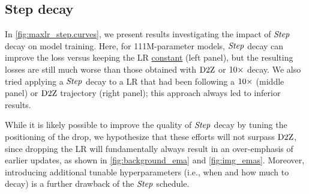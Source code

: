 \subsection{Step decay}




In \cref{fig:maxlr_step.curves}, we present results investigating the
impact of $\mbox{\emph{Step}}$ decay on model training.  Here, for 111M-parameter
models, $\mbox{\emph{Step}}$ decay can improve the loss versus keeping the LR
\underline{constant} (left panel), but the resulting losses are still
much worse than those obtained with $\mbox{D2Z}$ or $\mbox{10}\times$ decay.  We also
tried applying a $\mbox{\emph{Step}}$ decay to a LR that had been following a
$\mbox{10}\times$ (middle panel) or $\mbox{D2Z}$ trajectory (right panel); this
approach always led to inferior results.

While it is likely possible to improve the quality of $\mbox{\emph{Step}}$ decay by
tuning the positioning of the drop, we hypothesize that these efforts
will not surpass $\mbox{D2Z}$, since dropping the LR will fundamentally
always result in an over-emphasis of earlier updates, as shown in
\cref{fig:background_ema} and \cref{fig:img_emas}.  Moreover,
introducing additional tunable hyperparameters (i.e., when and how
much to decay) is a further drawback of the $\mbox{\emph{Step}}$ schedule.


%

